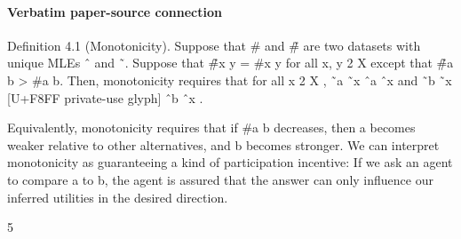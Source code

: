 \documentclass[10pt]{article}
\begin{document}
\paragraph{Verbatim paper-source connection}
\begin{ReviewVerbatim}
Definition 4.1 (Monotonicity). Suppose that # and #̃ are two datasets with unique MLEs ˆ and ˜.
Suppose that #̃{x y} = #{x y} for all x, y 2 X except that #̃{a                   b} > #{a     b}. Then,
monotonicity requires that for all x 2 X ,
                           ˜a     ˜x   ˆa    ˆx    and    ˜b    ˜x [U+F8FF private-use glyph] ˆb    ˆx .

Equivalently, monotonicity requires that if #{a b} decreases, then a becomes weaker relative to
other alternatives, and b becomes stronger. We can interpret monotonicity as guaranteeing a kind of
participation incentive: If we ask an agent to compare a to b, the agent is assured that the answer can
only influence our inferred utilities in the desired direction.


                                                    5


\end{ReviewVerbatim}
\end{document}
